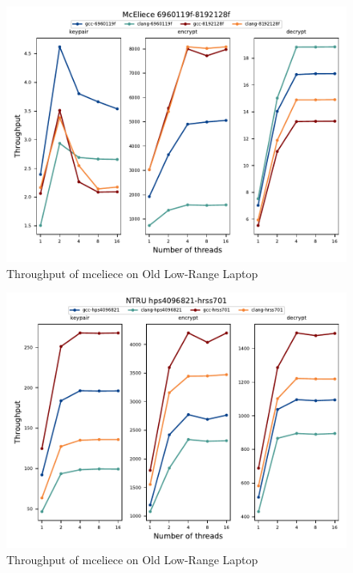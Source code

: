 \begin{figure}
    \centering
    \includegraphics[scale=0.75]{chapters/results/throughput/McEliece 6960119f-8192128f Old Low-Range Laptop.pdf}
    \caption{Throughput of \gls{mceliece} on Old Low-Range Laptop}
    \label{figure:results:throughput:ntru:old-low-range-laptop}
\end{figure}

\begin{figure}
    \centering
    \includegraphics[scale=0.75]{chapters/results/throughput/NTRU hps4096821-hrss701 Old Low-Range Laptop.pdf}
    \caption{Throughput of \gls{mceliece} on Old Low-Range Laptop}
    \label{figure:results:throughput:mceliece:old-low-range-laptop}
\end{figure}

